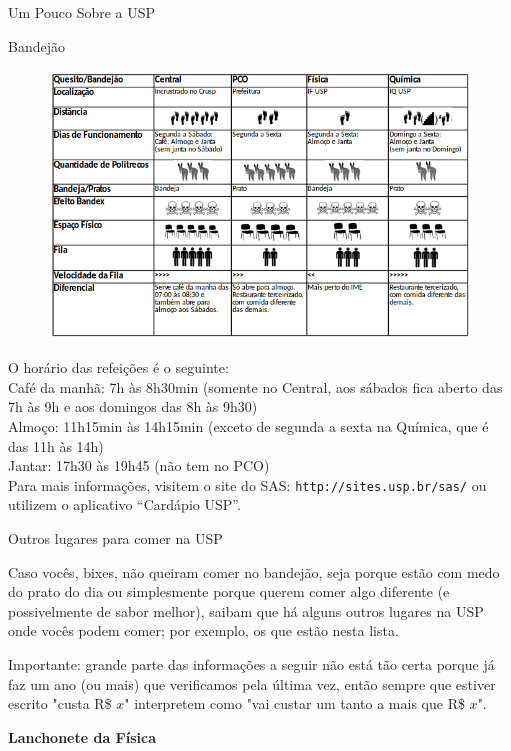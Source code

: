 \begin{secao}{Um Pouco Sobre a USP}
\begin{subsecao}{Bandejão}
\begin{figure}[!htbp]
\begin{center}
	\includegraphics{img/src/bandex.png}
\end{center}
\end{figure}
O horário das refeições é o seguinte:\\
Café da manhã: 7h às 8h30min (somente no Central, aos sábados fica aberto das
7h às 9h e aos domingos das 8h às 9h30)\\
Almoço: 11h15min às 14h15min (exceto de segunda a sexta na Química, que é das 11h às 14h)\\
Jantar: 17h30 às 19h45 (não tem no PCO)\\

Para mais informações, visitem o site do SAS: {\tt http://sites.usp.br/sas/} ou
utilizem o aplicativo ``Cardápio USP''.

\end{subsecao}

\begin{subsecao}{Outros lugares para comer na USP}

Caso vocês, bixes, não queiram comer no bandejão, seja porque estão com medo do
prato do dia ou simplesmente porque querem comer algo diferente (e
possivelmente de sabor melhor), saibam que há alguns outros lugares na USP onde
vocês podem comer; por exemplo, os que estão nesta lista.

Importante: grande parte das informações a seguir não está tão certa porque já
faz um ano (ou mais) que verificamos pela última vez, então sempre que estiver
escrito "custa R\$ $x$" interpretem como "vai custar um tanto a mais que R\$ $x$".

{\bf Lanchonete da Física}


\end{subsecao}
\end{secao}
